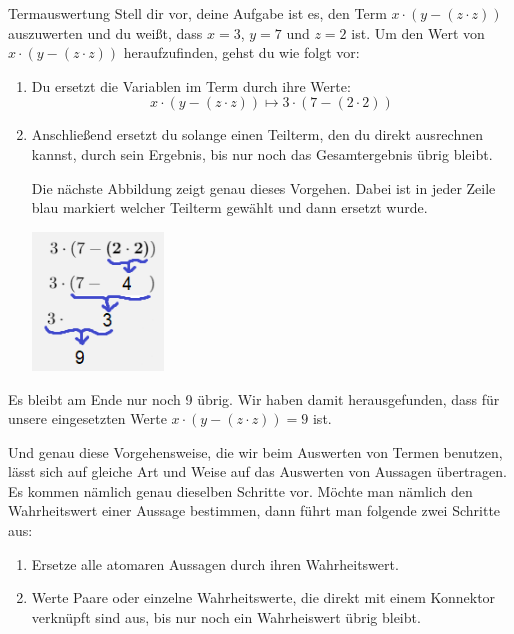 \documentclass[../../main.tex]{subfiles}
\begin{document}
\begin{example}{Termauswertung}
Stell dir vor, deine Aufgabe ist es, den Term $x \cdot (y - (z \cdot z))$ auszuwerten
 und du weißt, dass $x = 3$, $y = 7$ und  $z = 2$ ist.
Um den Wert von $x \cdot (y - (z \cdot z))$ heraufzufinden, gehst
du wie folgt vor:
\begin{enumerate}
    \item Du ersetzt die Variablen im Term durch ihre Werte:
    \[x \cdot (y - (z \cdot z)) \longmapsto 3 \cdot (7 - (2 \cdot 2)) \]
    
    \item Anschließend ersetzt du solange einen Teilterm, den du direkt ausrechnen 
    kannst, durch sein Ergebnis, bis nur noch das Gesamtergebnis übrig bleibt.
    
    
    Die nächste Abbildung zeigt genau dieses Vorgehen. Dabei ist in jeder Zeile blau markiert welcher Teilterm gewählt und dann ersetzt wurde.
    \begin{center}
        \includegraphics[width=0.275\textwidth]{images/TEMP_termalg.png}
    \end{center}
\end{enumerate}
    Es bleibt am Ende nur noch 9 übrig. Wir haben damit herausgefunden, 
    dass für unsere eingesetzten Werte $x \cdot (y - (z \cdot z)) = 9$ ist.

\end{example}

Und genau diese Vorgehensweise, die wir beim Auswerten von Termen benutzen, 
lässt sich auf gleiche Art und Weise auf das Auswerten von Aussagen übertragen. 
Es kommen nämlich genau dieselben Schritte vor. Möchte man nämlich den Wahrheitswert einer Aussage bestimmen, dann führt man folgende zwei Schritte aus:
    \begin{enumerate}
    \item Ersetze alle atomaren Aussagen durch ihren Wahrheitswert.
    \item Werte Paare oder einzelne Wahrheitswerte, die direkt mit einem Konnektor
        verknüpft sind aus, bis nur noch ein Wahrheiswert übrig bleibt.
    \end{enumerate}
    
\end{document}
